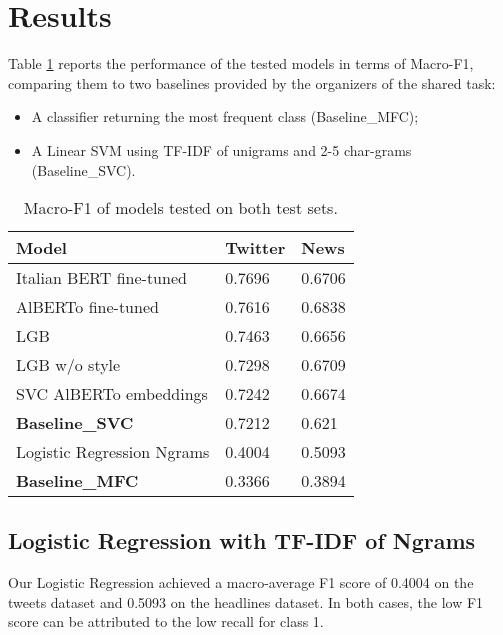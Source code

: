 \documentclass[a4paper, 9pt, twocolumn, DIV=calc]{scrartcl}
\begin{document}







\section{Results}

Table \ref{tab:models_performance} reports the performance of the tested models in terms of Macro-F1, comparing them to two baselines provided by the organizers of the shared task:

\begin{itemize}
    \item A classifier returning the most frequent class (Baseline\_MFC);
    \item A Linear SVM using TF-IDF of unigrams and 2-5 char-grams (Baseline\_SVC).
\end{itemize}

\begin{table}[h]
    \centering
    \begin{tabular}{lll}
        \toprule
        Model & Twitter & News\\
        \midrule
        Italian BERT fine-tuned & 0.7696 & 0.6706\\
        AlBERTo fine-tuned & 0.7616 & 0.6838\\
        LGB & 0.7463 & 0.6656\\
        LGB w/o style & 0.7298 & 0.6709\\
        SVC AlBERTo embeddings & 0.7242 & 0.6674\\
        \textbf{Baseline\_SVC} & 0.7212 & 0.621\\
        Logistic Regression Ngrams & 0.4004 & 0.5093\\
        \textbf{Baseline\_MFC} & 0.3366 & 0.3894\\
        \bottomrule
    \end{tabular}
    \caption{Macro-F1 of models tested on both test sets.}
    \label{tab:models_performance}
\end{table}

\subsection{Logistic Regression with TF-IDF of Ngrams}

Our Logistic Regression achieved a macro-average F1 score of 0.4004 on the tweets dataset and 0.5093 on the headlines dataset. In both cases, the low F1 score can be attributed to the low recall for class 1.
\end{document}

